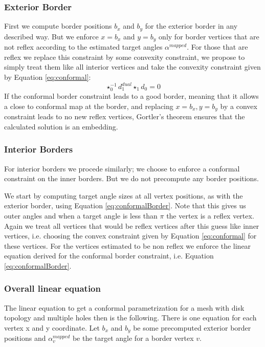 \subsubsection{Exterior Border}
First we compute border positions $b_x$ and $b_y$ for the exterior border in any described way. But we enforce $x = b_x$ and $y= b_y$ only for border vertices that are not reflex according to the estimated target angles $\alpha^{mapped}$. For those that are reflex we replace this constraint by some convexity constraint, we propose to simply treat them like all interior vertices and take the convexity constraint given by Equation \ref{eq:conformal}:
\[\star_0^{-1} d_1^{dual} \star_1 d_0=0\]
If the conformal border constraint leads to a good border, meaning that it allows a close to conformal map at the border, and replacing $x=b_x, y=b_y$ by a convex constraint leads to no new reflex vertices, Gortler's theorem ensures that the calculated solution is an embedding.

\subsubsection{Interior Borders}
For interior borders we procede similarly; we choose to enforce a conformal constraint on the inner borders. But we do not precompute any border positions.

We start by computing target angle sizes at all vertex positions, as with the exterior border, using Equation \ref{eq:conformalBorder}. Note that this gives us outer angles  and when a target angle is less than $\pi$ the vertex is a reflex vertex. Again we treat all vertices that would be reflex vertices after this guess like inner vertices, i.e. choosing the convex constraint given by Equation \ref{eq:conformal} for these vertices. For the vertices estimated to be non reflex we enforce the linear equation derived for the conformal border constraint, i.e. Equation \ref{eq:conformalBorder}.

\subsubsection{Overall linear equation}
The linear equation to get a conformal parametrization for a mesh with disk topology and multiple holes then is the following.
There is one equation for each vertex x and y coordinate. Let $b_x$ and $b_y$ be some precomputed exterior border positions and $\alpha_v^{mapped}$ be the target angle for a border vertex $v$.

